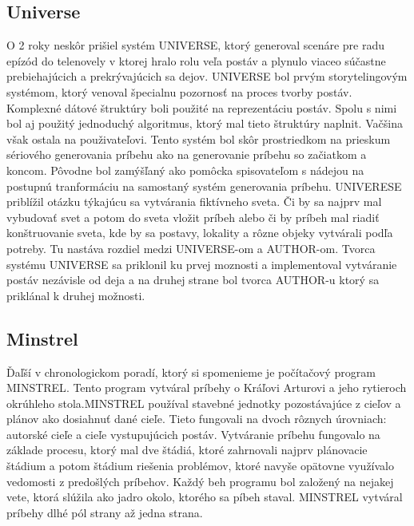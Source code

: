 \subsection{Universe}
O 2 roky neskôr prišiel systém UNIVERSE\cite{universe}, ktorý generoval scenáre pre radu epízód do telenovely v ktorej hralo rolu veľa postáv a plynulo viaceo súčastne prebiehajúcich a prekrývajúcich sa dejov. UNIVERSE bol prvým storytelingovým systémom, ktorý venoval špecialnu pozornosť na proces tvorby postáv. Komplexné dátové štruktúry boli použité na reprezentáciu postáv. Spolu s nimi bol aj použitý jednoduchý algoritmus, ktorý mal tieto štruktúry naplnit. Vačšina však ostala na použivateľovi. Tento systém bol skôr prostriedkom na prieskum sériového generovania príbehu ako na generovanie príbehu so začiatkom a koncom. Pôvodne bol zamýšľaný ako pomôcka spisovateľom s nádejou na postupnú tranformáciu na samostaný systém generovania príbehu. UNIVERESE priblížil otázku týkajúcu sa vytvárania fiktívneho sveta. Či by sa najprv mal vybudovať svet a potom do sveta vložit príbeh alebo či by príbeh mal riadiť konštruovanie sveta, kde by sa postavy, lokality a rôzne objeky vytvárali podľa potreby. Tu nastáva rozdiel medzi UNIVERSE-om a AUTHOR-om. Tvorca systému UNIVERSE sa priklonil ku prvej moznosti a implementoval vytváranie postáv nezávisle od deja a na druhej strane bol tvorca AUTHOR-u ktorý sa priklánal k druhej možnosti.\par
\subsection{Minstrel}
Ďaľší v chronologickom poradí, ktorý si spomenieme je počítačový program MINSTREL\cite{minstrel}. Tento program vytváral príbehy o Kráľovi Arturovi a jeho rytieroch okrúhleho stola.MINSTREL používal stavebné jednotky pozostávajúce z cieľov a plánov ako dosiahnuť dané cieľe. Tieto fungovali na dvoch rôznych úrovniach: autorské cieľe a cieľe vystupujúcich postáv. Vytváranie príbehu fungovalo na základe procesu, ktorý mal dve štádiá, ktoré zahrnovali najprv plánovacie štádium a potom štádium riešenia problémov, ktoré navyše opätovne využívalo vedomosti z predošlých príbehov. Každý beh programu bol založený na nejakej vete, ktorá slúžila ako jadro okolo, ktorého sa píbeh staval.  MINSTREL vytváral príbehy dlhé pól strany až jedna strana.\par
